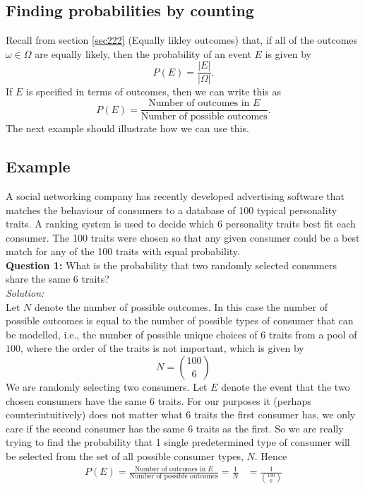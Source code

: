 \subsection{Finding probabilities by counting} \label{secprobcounting}
\noindent Recall from section \ref{sec222} (Equally likley outcomes) that, if all of the outcomes $\omega \in \Omega$ are equally likely, then the probability of an event $E$ is given by
\[
P(E) = \frac{|E|}{|\Omega|}.
\]
If $E$ is specified in terms of outcomes, then we can write this as
\[
P(E) = \frac{\text{Number of outcomes in $E$}}{\text{Number of possible outcomes}}.
\]
The next example should illustrate how we can use this.

\subsection{Example}
\noindent A social networking company has recently developed advertising software that matches the behaviour of consumers to a database of 100 typical personality traits. A ranking system is used to decide which 6 personality traits best fit each consumer. The 100 traits were chosen so that any given consumer could be a best match for any of the 100 traits with equal probability. \\

\noindent \textbf{Question 1:} What is the probability that two randomly selected consumers share the same 6 traits? \\
\noindent \textit{Solution:} \\
Let $N$ denote the number of possible outcomes. In this case the number of possible outcomes is equal to the number of possible types of consumer that can be modelled, i.e., the number of possible unique choices of $6$ traits from a pool of $100$, where the order of the traits is not important, which is given by 
\[
N = \binom{100}{6} \tag{unordered sampling without replacement}
\]
We are randomly selecting two consumers. Let $E$ denote the event that the two chosen consumers have the same 6 traits. For our purposes it (perhaps counterintuitively) does not matter what 6 traits the first consumer has, we only care if the second consumer has the same 6 traits as the first. So we are really trying to find the probability that 1 single predetermined type of consumer will be selected from the set of all possible consumer types, $N$. Hence
\begin{align*}
P(E) = \frac{\text{Number of outcomes in $E$}}{\text{Number of possible outcomes}} = \frac{1}{N} & = \frac{1}{\binom{100}{6}}
\end{align*}

